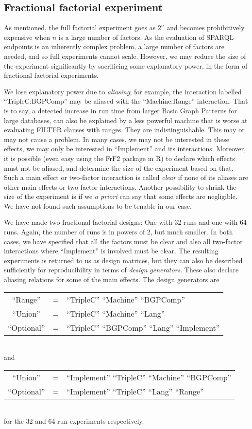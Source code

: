 \documentclass{llncs}
\begin{document}
\subsection{Fractional factorial experiment}\label{sec:frac}

As mentioned, the full factorial experiment goes as $2^n$ and becomes
prohibitively expensive when $n$ is a large number of factors. As the
evaluation of SPARQL endpoints is an inherently complex problem, a
large number of factors are needed, and so full experiments cannot
scale. However, we may reduce the size of the experiment significantly
by sacrificing some explanatory power, in the form of fractional
factorial experiments.

We lose explanatory power due to \emph{aliasing}; for example, the
interaction labelled ``TripleC:BGPComp'' may be aliased with the
``Machine:Range'' interaction. That is to say, a detected increase in
run time from larger Basic Graph Patterns for large databases, can
also be explained by a less powerful machine that is worse at
evaluating FILTER clauses with ranges. They are
indistinguishable. This may or may not cause a problem. In many cases,
we may not be interested in these effects, we may only be interested
in ``Implement'' and its interactions. Moreover, it is possible (even
easy using the FrF2 package in R) to declare which effects must not be
aliased, and determine the size of the experiment based on that. Such
a main effect or two-factor interaction is called \emph{clear} if none
of its aliases are other main effects or two-factor
interactions. Another possibility to shrink the size of the experiment
is if we \textit{a priori} can say that some effects are
negligible. We have not found such assumptions to be tenable in our
case.

We have made two fractional factorial designs: One with 32 runs and
one with 64 runs. Again, the number of runs is in powers of 2, but
much smaller. In both cases, we have specified that all the factors
must be clear and also all two-factor interactions where ``Implement''
is involved must be clear. The resulting experiments is returned to us
as design matrices, but they can also be described sufficiently for
reproducibility in terms of \emph{design generators}. These also
declare aliasing relations for some of the main effects. The design
generators are\\
\begin{tabular}{ccl}
``Range'' &=& ``TripleC'' ``Machine'' ``BGPComp'' \\  
``Union'' &=& ``TripleC'' ``Machine'' ``Lang'' \\  
``Optional'' &=& ``TripleC'' ``BGPComp'' ``Lang'' ``Implement'' 
\end{tabular}
\\and\\
\begin{tabular}{ccl}
``Union'' &=& ``Implement''  ``TripleC''  ``Machine'' ``BGPComp'' \\
``Optional'' &=& ``Implement''  ``TripleC'' ``Lang''  ``Range'' 
\end{tabular}
\\for the 32 and 64 run experiments respectively.
\end{document}
